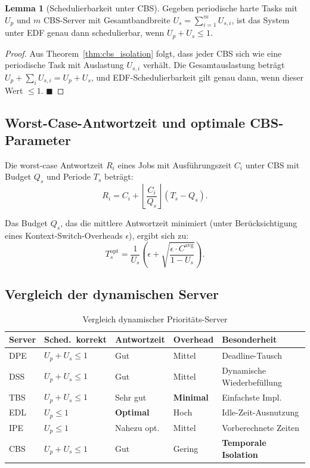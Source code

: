 ﻿\documentclass[a4paper,12pt]{report}
\theoremstyle{definition}
\newtheorem{lemma}{Lemma}[chapter]
\begin{document}
\begin{lemma}[Schedulierbarkeit unter CBS]
	Gegeben periodische harte Tasks mit $U_p$ und $m$ CBS-Server mit Gesamtbandbreite
	$U_s = \sum_{i=1}^m U_{s,i}$, ist das System unter EDF genau dann schedulierbar,
	wenn $U_p + U_s \leq 1$.
\end{lemma}

\begin{proof}
	Aus Theorem~\ref{thm:cbs_isolation} folgt, dass jeder CBS sich wie eine
	periodische Task mit Auslastung $U_{s,i}$ verhält. Die Gesamtauslastung
	beträgt $U_p + \sum_i U_{s,i} = U_p + U_s$, und EDF-Schedulierbarkeit
	gilt genau dann, wenn dieser Wert $\leq 1$. \hfill$\blacksquare$
\end{proof}

\subsection{Worst-Case-Antwortzeit und optimale CBS-Parameter}

Die worst-case Antwortzeit $R_i$ eines Jobs mit Ausführungszeit $C_i$ unter CBS mit
Budget $Q_s$ und Periode $T_s$ beträgt:
\[
	R_i = C_i + \left\lfloor \frac{C_i}{Q_s} \right\rfloor (T_s - Q_s).
\]

Das Budget $Q_s$, das die mittlere Antwortzeit minimiert (unter Berücksichtigung
eines Kontext-Switch-Overheads $\epsilon$), ergibt sich zu:
\[
	T_s^{\mathrm{opt}} = \frac{1}{U_s} \left( \epsilon + \sqrt{\frac{\epsilon \cdot C^{\mathrm{avg}}}{1-U_s}} \right).
\]

\subsection{Vergleich der dynamischen Server}

\begin{table}[H]
	\centering
	\caption{Vergleich dynamischer Prioritäts-Server}
	\label{tab:dynserver}
	\begin{tabular}{p{2.5cm}p{2cm}p{2cm}p{2cm}p{3cm}}
		\toprule
		\textbf{Server} & \textbf{Sched.\ korrekt} & \textbf{Antwort\-zeit} & \textbf{Overhead} & \textbf{Besonderheit} \\
		\midrule
		DPE  & $U_p+U_s\leq 1$ & Gut & Mittel & Deadline-Tausch \\
		DSS  & $U_p+U_s\leq 1$ & Gut & Mittel & Dynamische Wiederbefüllung \\
		TBS  & $U_p+U_s\leq 1$ & Sehr gut & \textbf{Minimal} & Einfachste Impl. \\
		EDL  & $U_p \leq 1$ & \textbf{Optimal} & Hoch & Idle-Zeit-Ausnutzung \\
		IPE  & $U_p \leq 1$ & Nahezu opt. & Mittel & Vorberechnete Zeiten \\
		CBS  & $U_p+U_s\leq 1$ & Gut & Gering & \textbf{Temporale Isolation} \\
		\bottomrule
	\end{tabular}
\end{table}
\end{document}
